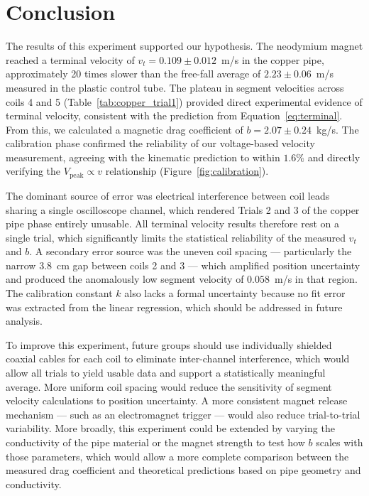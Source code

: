 \documentclass[11pt]{article}
\begin{document}
\section{Conclusion}
\label{sec:conclusion}

The results of this experiment supported our hypothesis. The neodymium magnet reached a
terminal velocity of $v_t = 0.109 \pm 0.012$~m/s in the copper pipe, approximately 20 times
slower than the free-fall average of $2.23 \pm 0.06$~m/s measured in the plastic control tube.
The plateau in segment velocities across coils 4 and 5 (Table~\ref{tab:copper_trial1}) provided
direct experimental evidence of terminal velocity, consistent with the prediction from
Equation~\ref{eq:terminal}. From this, we calculated a magnetic drag coefficient of
$b = 2.07 \pm 0.24$~kg/s. The calibration phase confirmed the reliability of our
voltage-based velocity measurement, agreeing with the kinematic prediction to within $1.6\%$
and directly verifying the $V_\text{peak} \propto v$ relationship (Figure~\ref{fig:calibration}).

The dominant source of error was electrical interference between coil leads sharing a single
oscilloscope channel, which rendered Trials 2 and 3 of the copper pipe phase entirely unusable.
All terminal velocity results therefore rest on a single trial, which significantly limits the
statistical reliability of the measured $v_t$ and $b$. A secondary error source was the uneven
coil spacing --- particularly the narrow 3.8~cm gap between coils 2 and 3 --- which amplified
position uncertainty and produced the anomalously low segment velocity of $0.058$~m/s in that
region. The calibration constant $k$ also lacks a formal uncertainty because no fit error was
extracted from the linear regression, which should be addressed in future analysis.

To improve this experiment, future groups should use individually shielded coaxial cables for
each coil to eliminate inter-channel interference, which would allow all trials to yield usable
data and support a statistically meaningful average. More uniform coil spacing would reduce the
sensitivity of segment velocity calculations to position uncertainty. A more consistent magnet
release mechanism --- such as an electromagnet trigger --- would also reduce trial-to-trial
variability. More broadly, this experiment could be extended by varying the conductivity of the
pipe material or the magnet strength to test how $b$ scales with those parameters, which would
allow a more complete comparison between the measured drag coefficient and theoretical
predictions based on pipe geometry and conductivity.
\end{document}
